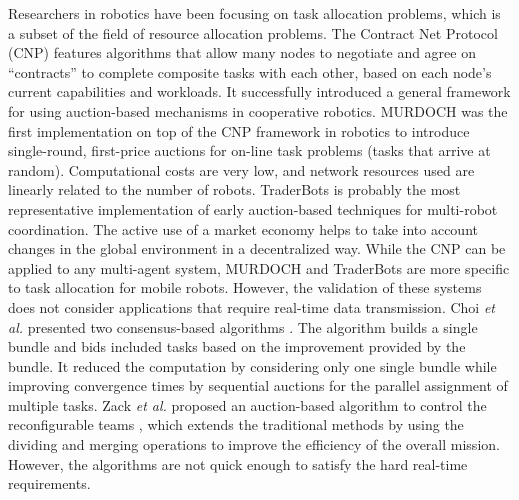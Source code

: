 \documentclass[journal]{IEEEtran}  %
\begin{document}
Researchers in robotics have been focusing on task allocation problems, which
is a subset of the field of resource allocation problems.
The Contract Net Protocol (CNP) \cite{wang2014multi} features algorithms that
allow many nodes to negotiate and agree on ``contracts'' to complete composite
tasks with each other, based on each node's current capabilities and
workloads.  It successfully introduced a general framework for using
auction-based mechanisms in cooperative robotics.
MURDOCH \cite{soldBP2002} was the first implementation on top of the CNP
framework in robotics to introduce single-round, first-price auctions for
on-line task problems (tasks that arrive at random). 
Computational costs are very low, and network resources used are linearly
related to the number of robots. 
TraderBots \cite{TraderBotsDias2003} is probably the most representative
implementation of early auction-based techniques for multi-robot coordination. 
The active use of a market economy helps to take into account changes in the
global environment in a decentralized way. 
While the CNP can be applied to any multi-agent system, MURDOCH and
TraderBots are more specific to task allocation for mobile robots. 
However, the validation of these systems does not consider applications that
require real-time data transmission.
Choi \textit{et al.} presented two consensus-based algorithms
\cite{choi2009consensus}. 
The algorithm builds a single bundle and bids included tasks based on the
improvement provided by the bundle.
It reduced the computation by considering only one single bundle while
improving convergence times by sequential auctions for the parallel assignment
of multiple tasks. 
Zack \textit{et al.} proposed an auction-based algorithm to control the 
reconfigurable teams \cite{Butler2015taskallocation}, which 
extends the traditional methods by using the dividing and merging operations
to improve the efficiency of the overall mission.
However, the algorithms are not quick enough to satisfy the hard real-time
requirements.
\end{document}
